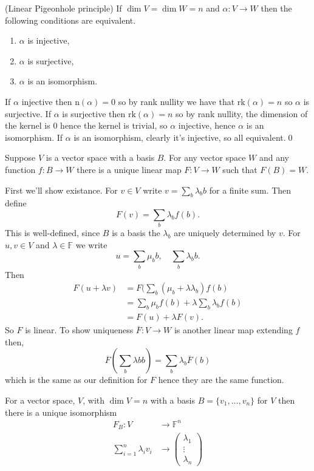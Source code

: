 \documentclass{article}
\newcommand{\F}{\mathbb{F}}
\newcommand{\n}{\mathrm{n}}
\newcommand{\rk}{\mathrm{rk}}
\begin{document}
\begin{corollary}
	(Linear Pigeonhole principle) If $ \dim V=\dim W=n $ and $ \alpha: V\to W $ then the following conditions are equivalent.
	\begin{enumerate}
		\item $ \alpha $ is injective,
		\item $ \alpha $ is surjective,
		\item $ \alpha $ is an isomorphism.
	\end{enumerate}
\end{corollary}
\pf If $ \alpha $ injective then $ \n(\alpha)=0 $ so by rank nullity we have that $ \rk(\alpha)=n $ so $ \alpha $ is surjective. If $ \alpha $ is surjective then $ \rk(\alpha)=n $ so by rank nullity, the dimension of the kernel is $ 0 $ hence the kernel is trivial, so $ \alpha $ injective, hence $ \alpha $ is an isomorphism. If $ \alpha $ is an isomorphism, clearly it's injective, so all equivalent.\qed
\begin{proposition}
  Suppose $ V $ is a vector space with a basis $ B $. For any vector space $ W	 $ and any function $ f:B\to W $ there is a unique linear map $ F:V\to W $ such that $ F(B)=W $.
\end{proposition}
\pf First we'll show existance. For $ v\in V $ write $ v=\sum_b\lambda_bb $ for a finite sum. Then define
\[
  F(v)=\sum_b \lambda_bf(b).
\]
This is well-defined, since $ B $ is a basis the $ \lambda_b $ are uniquely determined by $ v $. For $ u,v\in V $ and $ \lambda\in \F $ we write
\[
  u=\sum_b\mu_bb,\quad \sum_b\lambda_bb.
\]
Then \begin{align*}
	F(u+\lambda v)&=F(\sum_b(\mu_b+\lambda\lambda_b)f(b)\\
		     &= \sum_b\mu_bf(b)+\lambda\sum_b\lambda_bf(b)\\
		     &= F(u)+\lambda F(v).
\end{align*}
So $ F $ is linear. To show uniqueness $ \overline F:V\to W $ is another linear map extending $ f $ then,
\[
  \overline F\left(\sum_b\lambda bb\right)=\sum_b\lambda_b\overline F(b)
\]
which is the same as our definition for $ F $ hence they are the same function.
\begin{corollary}
	For a vector space, $ V $, with $ \dim V=n $ with a basis $ B=\{v_1,\dots, v_n\} $ for $ V $ then there is a unique isomorphism
  \begin{align*}
	  F_B:V&\to \F^n\\
	       \sum_{i=1}^n\lambda_iv_i &\to \begin{pmatrix}
	        \lambda_1\\
		\vdots \\
		\lambda_n
	      \end{pmatrix}
  \end{align*}
  \end{corollary}
\end{document}
